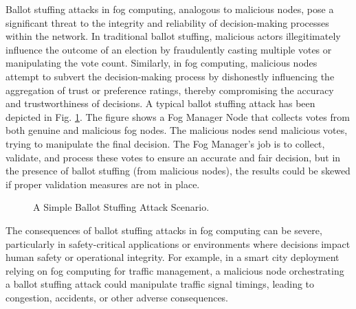 \documentclass{sn-jnl}%
\begin{document}
Ballot stuffing attacks in fog computing, analogous to malicious nodes, pose a significant threat to the integrity and reliability of decision-making processes within the network. In traditional ballot stuffing, malicious actors illegitimately influence the outcome of an election by fraudulently casting multiple votes or manipulating the vote count. Similarly, in fog computing, malicious nodes attempt to subvert the decision-making process by dishonestly influencing the aggregation of trust or preference ratings, thereby compromising the accuracy and trustworthiness of decisions. A typical ballot stuffing attack has been depicted in Fig. \ref{fig_1}. The figure shows a Fog Manager Node that collects votes from both genuine and malicious fog nodes. The malicious nodes send malicious votes, trying to manipulate the final decision. The Fog Manager's job is to collect, validate, and process these votes to ensure an accurate and fair decision, but in the presence of ballot stuffing (from malicious nodes), the results could be skewed if proper validation measures are not in place.
\begin{figure}[h!]
\begin{center}
\caption{A Simple Ballot Stuffing Attack Scenario.}
\label{fig_1}
\end{center}

\end{figure}


The consequences of ballot stuffing attacks in fog computing can be severe, particularly in safety-critical applications or environments where decisions impact human safety or operational integrity. For example, in a smart city deployment relying on fog computing for traffic management, a malicious node orchestrating a ballot stuffing attack could manipulate traffic signal timings, leading to congestion, accidents, or other adverse consequences.
\end{document}
